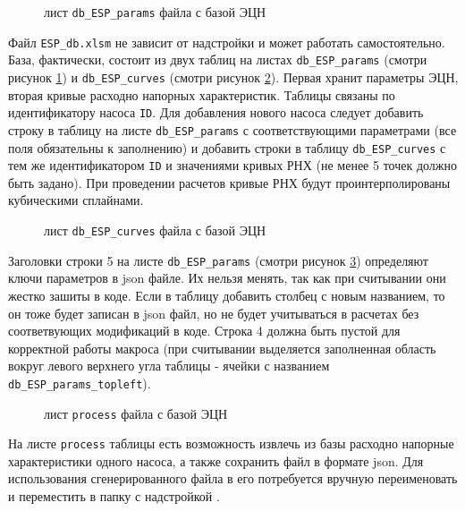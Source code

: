 \begin{figure}[H]
	\caption{лист \texttt{db_ESP_params} файла с базой ЭЦН}
	\label{ris:ESP_db_1}
\end{figure}

Файл \texttt{ESP_db.xlsm} не зависит от надстройки \unf{} и может работать самостоятельно. База, фактически, состоит из двух таблиц на листах \texttt{db_ESP_params} (смотри рисунок \ref{ris:ESP_db_1})  и \texttt{db_ESP_curves} (смотри  рисунок \ref{ris:ESP_db_2}). Первая хранит параметры ЭЦН, вторая кривые расходно напорных характеристик. Таблицы связаны по идентификатору насоса \texttt{ID}. Для добавления нового насоса следует добавить строку в таблицу на листе \texttt{db_ESP_params} с соответствующими параметрами (все поля обязательны к заполнению) и добавить строки в таблицу \texttt{db_ESP_curves} с тем же идентификатором \texttt{ID} и значениями кривых РНХ (не менее 5 точек должно быть задано). При проведении расчетов кривые РНХ будут проинтерполированы кубическими сплайнами.  

\begin{figure}[H]
	\caption{лист \texttt{db_ESP_curves} файла с базой ЭЦН}
	\label{ris:ESP_db_2}
\end{figure}

Заголовки строки 5 на листе \texttt{db_ESP_params} (смотри  рисунок \ref{ris:ESP_db_3}) определяют ключи параметров в json файле. Их нельзя менять, так как при считывании они жестко зашиты в коде. Если в таблицу добавить столбец с новым названием, то он тоже будет записан в json файл, но не будет учитываться в расчетах без соответвующих модификаций в коде. Строка 4 должна быть пустой для корректной работы макроса (при считывании выделяется заполненная область вокруг левого верхнего угла таблицы - ячейки с названием \texttt{db_ESP_params_topleft}).

\begin{figure}[H]
	\caption{лист \texttt{process} файла с базой ЭЦН}
	\label{ris:ESP_db_3}
\end{figure}

На листе \texttt{process} таблицы есть возможность извлечь из базы расходно напорные характеристики одного насоса, а также сохранить файл в формате json. Для использования сгенерированного файла в \unf{} его потребуется вручную переименовать и переместить в папку с надстройкой \unf{}. 



